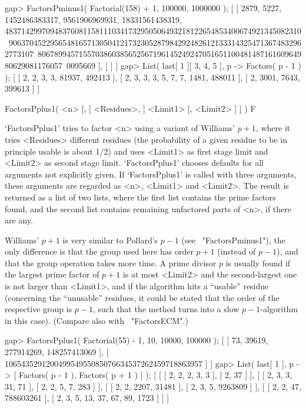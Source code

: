 \beginexample
gap> FactorsPminus1( Factorial(158) + 1, 100000, 1000000 );
[ [ 2879, 5227, 1452486383317, 9561906969931, 18331561438319, 
      483714299709483760811581110341732950506493218122654853400674921345082310\
906370452295654816571305041217323052879842924826121333143254713674832962773107\
806789945715570386038565256719614524924705165110048148716160964980629081176057\
0095669 ], [  ] ]
gap> List( last[ 1 ]{[ 3, 4, 5 ]}, p -> Factors( p - 1 ) );
[ [ 2, 2, 3, 3, 81937, 492413 ], [ 2, 3, 3, 3, 5, 7, 7, 1481, 488011 ], 
  [ 2, 3001, 7643, 399613 ] ]
\endexample


\>FactorsPplus1( <n> [, [ <Residues>, ] <Limit1> [, <Limit2> ] ] ) F

`FactorsPplus1' tries to factor <n> using a variant of Williams' $p+1$, 
where it tries <Residues> different residues (the probability of a 
given residue to be in principle usable is about 1/2) and 
uses <Limit1> as first stage limit and <Limit2> as second stage
limit. `FactorsPplus1' chooses defaults for all arguments
not explicitly given.
If `FactorsPplus1' is called with three arguments, these arguments
are regarded as <n>, <Limit1> and <Limit2>.
The result is returned as a list of two lists, where the first list
contains the prime factors found, and the second list contains
remaining unfactored parts of <n>, if there are any.

Williams' $p+1$ is very similar to Pollard's $p-1$ 
(see ~"FactorsPminus1"), the only difference is that the group 
used here has order $p+1$ (instead of $p-1$), and that the group
operation takes more time.
A prime divisor $p$ is usually found if the largest prime factor
of $p+1$ is at most <Limit2> and the second-largest one is not
larger than <Limit1>, and if the algorithm hits a ``usable''
residue (concerning the ``unusable'' residues, it could be stated
that the order of the respective group is $p-1$, such that
the method turns into a slow $p-1$-algorithm in this case).
(Compare also with ~"FactorsECM".)

\beginexample
gap> FactorsPplus1( Factorial(55) - 1, 10, 10000, 100000 );
[ [ 73, 39619, 277914269, 148257413069 ], 
  [ 106543529120049954955085076634537262459718863957 ] ]
gap> List( last[ 1 ], p -> [ Factors( p - 1 ), Factors( p + 1 ) ] );
[ [ [ 2, 2, 2, 3, 3 ], [ 2, 37 ] ], 
  [ [ 2, 3, 3, 31, 71 ], [ 2, 2, 5, 7, 283 ] ], 
  [ [ 2, 2, 2207, 31481 ], [ 2, 3, 5, 9263809 ] ], 
  [ [ 2, 2, 47, 788603261 ], [ 2, 3, 5, 13, 37, 67, 89, 1723 ] ] ]
\endexample

